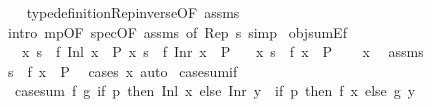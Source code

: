 \begin{isabellebody}
%
\isadelimproof
\ \ %
\endisadelimproof
%
\isatagproof
{}\isamarkupfalse%
\ type{\isacharunderscore}{\kern0pt}definition{\isachardot}{\kern0pt}Rep{\isacharunderscore}{\kern0pt}inverse{\isacharbrackleft}{\kern0pt}OF\ assms{\isacharparenleft}{\kern0pt}{}{\isacharparenright}{\kern0pt}{\isacharbrackright}{\kern0pt}\isanewline
\ \ \isamarkupfalse%
\ {\isacharparenleft}{\kern0pt}intro\ mp{\isacharbrackleft}{\kern0pt}OF\ spec{\isacharbrackleft}{\kern0pt}OF\ assms{\isacharparenleft}{\kern0pt}{}{\isacharparenright}{\kern0pt}{\isacharcomma}{\kern0pt}\ of\ {\isachardoublequoteopen}Rep\ s{\isachardoublequoteclose}{\isacharbrackright}{\kern0pt}{\isacharbrackright}{\kern0pt}{\isacharparenright}{\kern0pt}\ simp%
\endisatagproof
{\isafoldproof}%
%
\isadelimproof
\isanewline
%
\endisadelimproof
\isanewline
{}\isamarkupfalse%
\ obj{\isacharunderscore}{\kern0pt}sumE{\isacharunderscore}{\kern0pt}f{\isacharcolon}{\kern0pt}\isanewline
\ \ \ {\isachardoublequoteopen}{\isasymforall}x{\isachardot}{\kern0pt}\ s\ {\isacharequal}{\kern0pt}\ f\ {\isacharparenleft}{\kern0pt}Inl\ x{\isacharparenright}{\kern0pt}\ {\isasymlongrightarrow}\ P{\isachardoublequoteclose}\ {\isachardoublequoteopen}{\isasymforall}x{\isachardot}{\kern0pt}\ s\ {\isacharequal}{\kern0pt}\ f\ {\isacharparenleft}{\kern0pt}Inr\ x{\isacharparenright}{\kern0pt}\ {\isasymlongrightarrow}\ P{\isachardoublequoteclose}\isanewline
\ \ \ {\isachardoublequoteopen}{\isasymforall}x{\isachardot}{\kern0pt}\ s\ {\isacharequal}{\kern0pt}\ f\ x\ {\isasymlongrightarrow}\ P{\isachardoublequoteclose}\isanewline
%
\isadelimproof
%
\endisadelimproof
%
\isatagproof
{}\isamarkupfalse%
\isanewline
\ \ \isamarkupfalse%
\ x\ \isamarkupfalse%
\ assms\ \isamarkupfalse%
\ {\isachardoublequoteopen}s\ {\isacharequal}{\kern0pt}\ f\ x\ {\isasymlongrightarrow}\ P{\isachardoublequoteclose}\ \isamarkupfalse%
\ {\isacharparenleft}{\kern0pt}cases\ x{\isacharparenright}{\kern0pt}\ auto\isanewline
{}\isamarkupfalse%
%
\endisatagproof
{\isafoldproof}%
%
\isadelimproof
\isanewline
%
\endisadelimproof
\isanewline
{}\isamarkupfalse%
\ case{\isacharunderscore}{\kern0pt}sum{\isacharunderscore}{\kern0pt}if{\isacharcolon}{\kern0pt}\isanewline
\ \ {\isachardoublequoteopen}case{\isacharunderscore}{\kern0pt}sum\ f\ g\ {\isacharparenleft}{\kern0pt}if\ p\ then\ Inl\ x\ else\ Inr\ y{\isacharparenright}{\kern0pt}\ {\isacharequal}{\kern0pt}\ {\isacharparenleft}{\kern0pt}if\ p\ then\ f\ x\ else\ g\ y{\isacharparenright}{\kern0pt}{\isachardoublequoteclose}\isanewline

\end{isabellebody}
